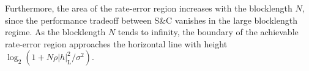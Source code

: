 \documentclass[conference,a4paper]{IEEEtran}
\begin{document}
Furthermore, the area of the rate-error region increases with the blocklength $N$, since the performance tradeoff between S\&C vanishes in the large blocklength regime. As the blocklength $N$ tends to infinity, the boundary of the achievable rate-error region approaches the horizontal line with height $\log_2(1+N\rho|h|_\mathrm{L}^2/\sigma^2) $.
%
%



%
%
\end{document}
